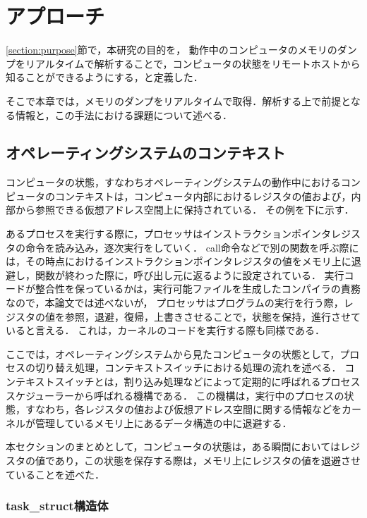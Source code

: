 \chapter{アプローチ}
\label{chap:approach}

\ref{section:purpose}節で，本研究の目的を，
動作中のコンピュータのメモリのダンプをリアルタイムで解析することで，コンピュータの状態をリモートホストから知ることができるようにする，と定義した．

そこで本章では，メモリのダンプをリアルタイムで取得．解析する上で前提となる情報と，この手法における課題について述べる．

\section{オペレーティングシステムのコンテキスト}
\label{section:context}

コンピュータの状態，すなわちオペレーティングシステムの動作中におけるコンピュータのコンテキストは，コンピュータ内部におけるレジスタの値および，内部から参照できる仮想アドレス空間上に保持されている．
その例を下に示す．

あるプロセスを実行する際に，プロセッサはインストラクションポインタレジスタの命令を読み込み，逐次実行をしていく．
call命令などで別の関数を呼ぶ際には，その時点におけるインストラクションポインタレジスタの値をメモリ上に退避し，関数が終わった際に，呼び出し元に返るように設定されている．
実行コードが整合性を保っているかは，実行可能ファイルを生成したコンパイラの責務なので，本論文では述べないが，
プロセッサはプログラムの実行を行う際，レジスタの値を参照，退避，復帰，上書きさせることで，状態を保持，進行させていると言える．
これは，カーネルのコードを実行する際も同様である．

ここでは，オペレーティングシステムから見たコンピュータの状態として，プロセスの切り替え処理，コンテキストスイッチにおける処理の流れを述べる．
コンテキストスイッチとは，割り込み処理などによって定期的に呼ばれるプロセススケジューラーから呼ばれる機構である．
この機構は，実行中のプロセスの状態，すなわち，各レジスタの値および仮想アドレス空間に関する情報などをカーネルが管理しているメモリ上にあるデータ構造の中に退避する．

本セクションのまとめとして，コンピュータの状態は，ある瞬間においてはレジスタの値であり，この状態を保存する際は，メモリ上にレジスタの値を退避させていることを述べた．

\subsection{task\_struct構造体}

